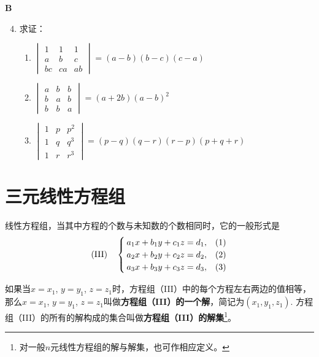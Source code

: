 \begin{center}
  \bfseries B
\end{center}
\begin{enumerate}\setcounter{enumi}{3}
  \item 求证：
\begin{enumerate}[(1)]
  \item $\begin{vmatrix}
    1&1&1\\a&b&c\\bc&ca&ab
  \end{vmatrix}=(a-b)(b-c)(c-a)$
  \item $\begin{vmatrix}
    a&b&b\\b&a&b\\b&b&a
  \end{vmatrix}=(a+2b)(a-b)^2$
  \item $\begin{vmatrix}
    1&p&p^2\\1&q&q^3\\1&r&r^3
  \end{vmatrix}=(p-q)(q-r)(r-p)(p+q+r)$
\end{enumerate}
\end{enumerate}

\section{三元线性方程组}
线性方程组，当其中方程的个数与未知数的个数相同时，它的一般形式是
\[({\rm III})\quad \begin{cases}
  a_1x+b_1y+c_1z=d_1, & (1)\\
  a_2x+b_2y+c_2z=d_2, & (2)\\
  a_3x+b_3y+c_3z=d_3, & (3)\\
\end{cases}\]

如果当$x=x_1$, $y=y_1$, $z=z_1$时，方程组（III）中的每个方程左右两边的值相等，那么$x=x_1$, $y=y_1$, $z=z_1$叫做\textbf{方程组（III）的一个解}，简记为$(x_1,y_1,z_1)$. 方程组（III）的所有的解构成的集合叫做\textbf{方程组（III）的解集}\footnote{对一般$n$元线性方程组的解与解集，也可作相应定义。}。

